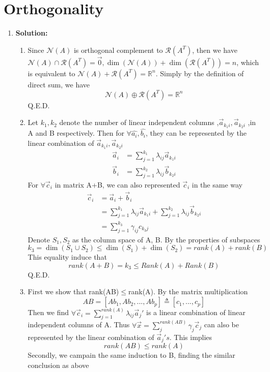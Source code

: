 \section{Orthogonality}
\begin{enumerate}
	
	\item \textbf{Solution:}
	\begin{enumerate}
		\item Since $\mathcal{N}(A)$ is orthogonal complement to  $\mathcal{R}(A^T)$, then we have $\mathcal{N}(A) \cap \mathcal{R}(A^T)=\vec{0}, \dim(\mathcal{N}(A))+\dim(\mathcal{R}(A^T))=n$, which is equivalent to $\mathcal{N}(A)+\mathcal{R}(A^T)=\mathbb{R}^n$. Simply by the definition of direct sum, we have
		$$\mathcal{N}(A)\oplus \mathcal{R}(A^T) = \mathbb{R}^n$$
		Q.E.D.
		\item Let $k_1, k_2$ denote the number of linear independent columns ,$\vec{a}_{k_1i}, \vec{a}_{k_2i}$ ,in A and B respectively. Then for $\forall \hat{a_i}, \hat{b_i}$, they can be represented by the linear combination of $\vec{a}_{k_1i}, \vec{a}_{k_2i}$
		\begin{align*}
		\vec{a}_i&=\sum_{j=1}^{k_1}\lambda_{ij}\vec{a}_{k_1i}\\
		\vec{b}_i&=\sum_{j=1}^{k_2}\lambda_{ij}\vec{b}_{k_2i}
		\end{align*}
		For $\forall \vec{c}_i$ in matrix A+B, we can also represented $\vec{c}_i$ in the same way
		\begin{align*}
		\vec{c}_i&=\vec{a}_i+\vec{b}_i\\
		&=\sum_{j=1}^{k_1}\lambda_{ij}\vec{a}_{k_1i}+\sum_{j=1}^{k_2}\lambda_{ij}\vec{b}_{k_2i}\\
		&=\sum_{j=1}^{k_3}\gamma_{ij}c_{k_3j}
		\end{align*}
		Denote $S_1,S_2$ as the column space of A, B. By the properties of subspaces
		$$k_3=\dim(S_1\cup S_2)\le\dim(S_1)+\dim(S_2)=rank(A)+rank(B)$$
		This equality induce that
		$$rank(A+B)=k_3\le Rank(A)+Rank(B)$$
		Q.E.D.
		\item First we show that rank(AB)$\le$rank(A). By the matrix multiplication
		$$AB=[Ab_1, Ab_2,...,Ab_p]\triangleq [c_1,...,c_p]$$
		Then we find $\forall \vec{c}_i = \sum_{j=1}^{rank(A)}\lambda_{ij}\vec{a}_j'$ is a linear combination of linear independent columns of A. Thus $\forall \vec{x}=\sum_j^{rank(AB)}\gamma_j\vec{c}_j$ can also be represented by the linear combination of $\vec{a}_j's$. This implies 
		$$rank(AB)\le rank(A)$$
		Secondly, we campain the same induction to B, finding the similar conclusion as above

\end{enumerate}
\end{enumerate}
